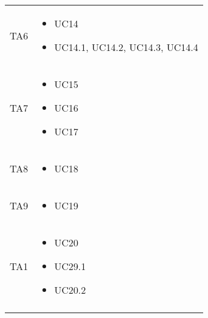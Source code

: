 {\begin{longtable}{C{.27\freewidth} C{.45\freewidth}}
    
    TA6 & \begin{itemize}
        \item UC14
        \item UC14.1, UC14.2, UC14.3, UC14.4
    \end{itemize} \\

    
    TA7 & \begin{itemize}
        \item UC15
        \item UC16
        \item UC17
    \end{itemize} \\

    
    TA8 & \begin{itemize}
        \item UC18
    \end{itemize} \\

    
    TA9 & \begin{itemize}
        \item UC19
    \end{itemize} \\

    TA1 & \begin{itemize}
        \item UC20
        \item UC29.1
        \item UC20.2
    \end{itemize} \\

\bottomrule
{}
\caption{}
\end{longtable}

}

